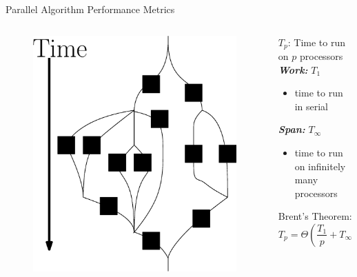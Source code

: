 \documentclass[xcolor=x11names, svgnames, rgb]{beamer}
\newcommand{\defn}[1]       {{\textit{\textbf{\boldmath #1}}}}
\begin{document}
\begin{frame}[t]{Parallel Algorithm Performance Metrics}
	\begin{columns}[T] %
	\begin{column}{.5\textwidth}
		\begin{figure}
			\includegraphics[width=\linewidth]{imgs/parallelForLoop/altParallelForLoopComposition.eps}
		\end{figure}
	\end{column}
	\hfill
	\begin{column}{.5\textwidth}
    \defn{$T_p$}: Time to run on $p$ processors\\
		\vspace{0.3cm}
		\defn{Work:} $T_1$
		\begin{itemize}
			\item time to run in serial
		\end{itemize}
		\vspace{0.3cm}
		\defn{Span:} $T_\infty$
		\begin{itemize}
			\item time to run on infinitely many processors
		\end{itemize}	
		\vspace{0.3cm}
    Brent's Theorem: $$T_p = \Theta\left( \frac{T_1}{p} + T_\infty
    \right)$$
	\end{column}
	\end{columns}
\end{frame}
\end{document}

